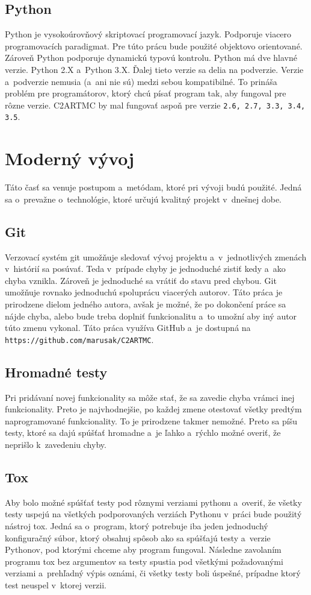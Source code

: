 \subsection{Python}
\label{subsec_python}
Python je vysokoúrovňový skriptovací programovací jazyk. Podporuje viacero programovacích
paradigmat. Pre túto prácu bude použité objektovo orientované. Zároveň Python podporuje
dynamickú typovú kontrolu.
Python má dve hlavné verzie. Python 2.X a~Python 3.X. Ďalej tieto verzie sa delia na podverzie.
Verzie a~podverzie nemusia (a~ani nie sú) medzi sebou kompatibilné. To prináša problém
pre programátorov, ktorý chcú písať program tak, aby fungoval pre rôzne verzie.
C2ARTMC by mal fungovať aspoň pre verzie \texttt{2.6, 2.7, 3.3, 3.4, 3.5}.

\section{Moderný vývoj}
Táto časť sa venuje postupom a~metódam, ktoré pri vývoji budú použité. Jedná sa
o~prevažne o~technológie, ktoré určujú kvalitný projekt v~dnešnej dobe.

\subsection{Git}
Verzovací systém git umožňuje sledovať vývoj projektu a~v~jednotlivých zmenách
v~histórií sa posúvať. Teda v~prípade chyby je jednoduché zistiť kedy a~ako chyba
vznikla. Zároveň je jednoduché sa vrátiť do stavu pred chybou.
Git umožňuje rovnako jednoduchú spoluprácu viacerých autorov. Táto práca je
prirodzene dielom jedného autora, avšak je možné, že po dokončení práce sa nájde
chyba, alebo bude treba doplniť funkcionalitu a~to umožní aby iný autor túto zmenu
vykonal.
Táto práca využíva GitHub a~je dostupná na \texttt{https://github.com/marusak/C2ARTMC}.

\subsection{Hromadné testy}
Pri pridávaní novej funkcionality sa môže stať, že sa zavedie chyba vrámci inej
funkcionality. Preto je najvhodnejšie, po každej zmene otestovať všetky predtým
naprogramované funkcionality. To je prirodzene takmer nemožné. Preto sa píšu testy,
ktoré sa dajú spúšťať hromadne a~je ľahko a~rýchlo možné overiť, že neprišlo
k~zavedeniu chyby.

\subsection{Tox}
\label{sec_tox}
Aby bolo možné spúšťať testy pod rôznymi verziami pythonu a~overiť, že všetky testy
uspejú na všetkých podporovaných verziách Pythonu v~práci bude použitý nástroj tox.
Jedná sa o~program, ktorý potrebuje iba jeden jednoduchý konfiguračný súbor, ktorý
obsahuj spôsob ako sa spúšťajú testy a~verzie Pythonov, pod ktorými chceme
aby program fungoval. Následne zavolaním programu tox bez argumentov sa testy
spustia pod všetkými požadovanými verziami a~prehľadný výpis oznámi, či všetky
testy boli úspešné, prípadne ktorý test neuspel v~ktorej verzii.



